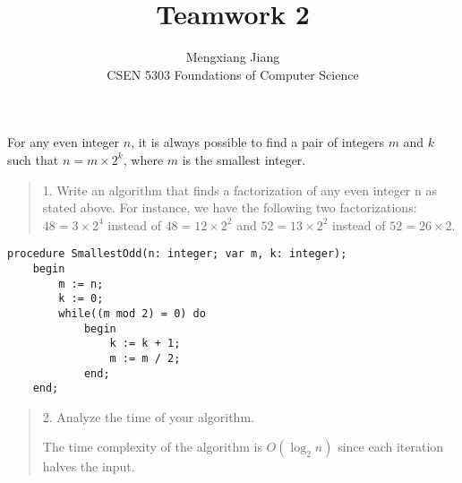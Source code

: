 \documentclass[12pt]{article}
\newenvironment{problem}[2][Problem]{\begin{trivlist}
\item[\hskip \labelsep {\bfseries #1}\hskip \labelsep {\bfseries #2.}]}{\end{trivlist}}
\begin{document}

\title{Teamwork 2}%
\author{Mengxiang Jiang\\ %
CSEN 5303 Foundations of Computer Science} %

\maketitle
\begin{problem}{2}
    For any even integer $n$, it is always possible to find a pair of integers $m$ and $k$ such that
$n = m \times 2^k$, where $m$ is the smallest integer.

\begin{quote}
    1. Write an algorithm that finds a factorization of any even integer n as stated above. For
    instance, we have the following two factorizations: $48 = 3 \times 2^4$ instead of 
    $48 = 12 \times 2^2$ and $52 = 13 \times 2^2$ instead of $52 = 26 \times 2$.
\end{quote}
\begin{verbatim}
procedure SmallestOdd(n: integer; var m, k: integer);
    begin
        m := n;
        k := 0;
        while((m mod 2) = 0) do
            begin
                k := k + 1;
                m := m / 2;
            end;
    end;
\end{verbatim}

\begin{quote}
    2. Analyze the time of your algorithm.

    The time complexity of the algorithm is $O(\log_2n)$ since each iteration halves the input.
\end{quote}


\end{problem}
\end{document}
